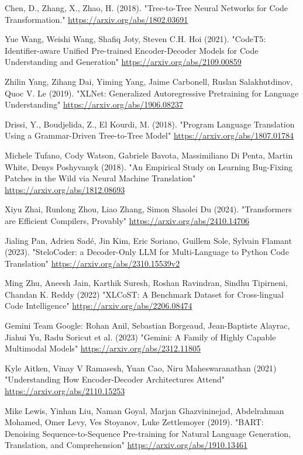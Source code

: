 \documentclass{dhbenelux}
\begin{document}
\begin{thebibliography}{99}
Chen, D., Zhang, X., Zhao, H. (2018). "Tree-to-Tree Neural Networks for Code Transformation." \href{https://arxiv.org/abs/1802.03691}{https://arxiv.org/abs/1802.03691}   

Yue Wang, Weishi Wang, Shafiq Joty, Steven C.H. Hoi (2021). "CodeT5: Identifier-aware Unified Pre-trained Encoder-Decoder Models for Code Understanding and Generation" \href{https://arxiv.org/abs/2109.00859}{https://arxiv.org/abs/2109.00859}

Zhilin Yang, Zihang Dai, Yiming Yang, Jaime Carbonell, Ruslan Salakhutdinov, Quoc V. Le (2019). "XLNet: Generalized Autoregressive Pretraining for Language Understanding" \href{https://arxiv.org/abs/1906.08237}{https://arxiv.org/abs/1906.08237}

Drissi, Y., Boudjelida, Z., El Kourdi, M. (2018). "Program Language Translation Using a Grammar-Driven Tree-to-Tree Model" \href{https://arxiv.org/abs/1807.01784}{https://arxiv.org/abs/1807.01784}

Michele Tufano, Cody Watson, Gabriele Bavota, Massimiliano Di Penta, Martin White, Denys Poshyvanyk (2018). "An Empirical Study on Learning Bug-Fixing Patches in the Wild via Neural Machine Translation"  \href{https://arxiv.org/abs/1812.08693}{https://arxiv.org/abs/1812.08693}

Xiyu Zhai, Runlong Zhou, Liao Zhang, Simon Shaolei Du (2024). "Transformers are Efficient Compilers, Provably" \href{https://arxiv.org/absX/2410.14706}{https://arxiv.org/abs/2410.14706} 

Jialing Pan, Adrien Sadé, Jin Kim, Eric Soriano, Guillem Sole, Sylvain Flamant (2023). "SteloCoder: a Decoder-Only LLM for Multi-Language to Python Code Translation" \href{https://arxiv.org/abs/2310.15539v2}{https://arxiv.org/abs/2310.15539v2}

Ming Zhu, Aneesh Jain, Karthik Suresh, Roshan Ravindran, Sindhu Tipirneni, Chandan K. Reddy (2022) "XLCoST: A Benchmark Dataset for Cross-lingual Code Intelligence" \href{https://arxiv.org/abs/2206.08474}{https://arxiv.org/abs/2206.08474}

Gemini Team Google: Rohan Anil, Sebastian Borgeaud, Jean-Baptiste Alayrac, Jiahui Yu, Radu Soricut et al. (2023) "Gemini: A Family of Highly Capable Multimodal Models" \href{https://arxiv.org/abs/2312.11805}{https://arxiv.org/abs/2312.11805}

Kyle Aitken, Vinay V Ramasesh, Yuan Cao, Niru Maheswaranathan (2021) "Understanding How Encoder-Decoder Architectures Attend" \href{https://arxiv.org/abs/2110.15253}{https://arxiv.org/abs/2110.15253}

Mike Lewis, Yinhan Liu, Naman Goyal, Marjan Ghazvininejad, Abdelrahman Mohamed, Omer Levy, Ves Stoyanov, Luke Zettlemoyer (2019). "BART: Denoising Sequence-to-Sequence Pre-training for Natural Language Generation, Translation, and Comprehension" \href{https://arxiv.org/abs/1910.13461}{https://arxiv.org/abs/1910.13461}

\end{thebibliography}
\end{document}
